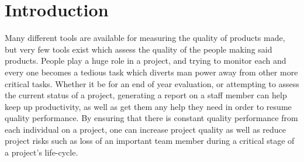 \documentclass[11pt,a4paper]{article}
\begin{document}
\thispagestyle{empty}
\pagebreak

\tableofcontents
\pagebreak
























































































\section{Introduction}
Many different tools are available for measuring the quality of products made, but very few tools exist which assess the quality of the people making said products. People play a huge role in a project, and trying to monitor each and every one becomes a tedious task which diverts man power away from other more critical tasks. Whether it be for an end of year evaluation, or attempting to assess the current status of a project, generating a report on a staff member can help keep up productivity, as well as get them any help they need in order to resume quality performance. By ensuring that there is constant quality performance from each individual on a project, one can increase project quality as well as reduce project risks such as loss of an important team member during a critical stage of a project's life-cycle. 
\end{document}
